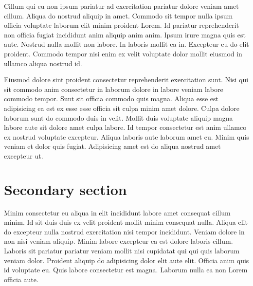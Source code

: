 \documentclass[
12pt,
openright,
oneside,
a4paper,
chapter=TITLE,
section=TITLE,
french,
spanish,
brazil,
english
]{abntex2}\usepackage{array}
\renewcommand{\baselinestretch}{1.5}
\newcommand{\newbibname}{REFERENCES}
\theoremstyle{plain}
\theoremstyle{remark}
\begin{document}
Cillum qui eu non ipsum pariatur ad exercitation pariatur dolore veniam
amet cillum. Aliqua do nostrud aliquip in amet. Commodo sit tempor nulla
ipsum officia voluptate laborum elit minim proident Lorem. Id pariatur
reprehenderit non officia fugiat incididunt anim aliquip anim anim.
Ipsum irure magna quis est aute. Nostrud nulla mollit non labore. In
laboris mollit ea in. Excepteur eu do elit proident. Commodo tempor nisi
enim ex velit voluptate dolor mollit eiusmod in ullamco aliqua nostrud
id.

Eiusmod dolore sint proident consectetur reprehenderit exercitation
sunt. Nisi qui sit commodo anim consectetur in laborum dolore in labore
veniam labore commodo tempor. Sunt sit officia commodo quis magna.
Aliqua esse est adipisicing ea est ex esse esse officia sit culpa minim
amet dolore. Culpa dolore laborum sunt do commodo duis in velit. Mollit
duis voluptate aliquip magna labore aute sit dolore amet culpa labore.
Id tempor consectetur est anim ullamco ex nostrud voluptate excepteur.
Aliqua laboris aute laborum amet eu. Minim quis veniam et dolor quis
fugiat. Adipisicing amet est do aliqua nostrud amet excepteur ut.

\section{Secondary section}\label{secondary-section-2}

Minim consectetur eu aliqua in elit incididunt labore amet consequat
cillum minim. Id sit duis duis ex velit proident mollit minim consequat
nulla. Aliqua elit do excepteur nulla nostrud exercitation nisi tempor
incididunt. Veniam dolore in non nisi veniam aliquip. Minim labore
excepteur ea est dolore laboris cillum. Laboris sit pariatur pariatur
veniam mollit nisi cupidatat qui qui quis laborum veniam dolor. Proident
aliquip do adipisicing dolor elit aute elit. Officia anim quis id
voluptate eu. Quis labore consectetur est magna. Laborum nulla ea non
Lorem officia aute.

\postextual

\begingroup
\renewcommand{\baselinestretch}{1}
\setcounter{footnote}{0}
\renewcommand{\thefootnote}{\fnsymbol{footnote}}
\printbibliography[heading=bibheading]
\endgroup


\addcontentsline{toc}{chapter}{
  \protect\numberline{}
  \newbibname
  \hspace{-0.25em}
}
\end{document}
